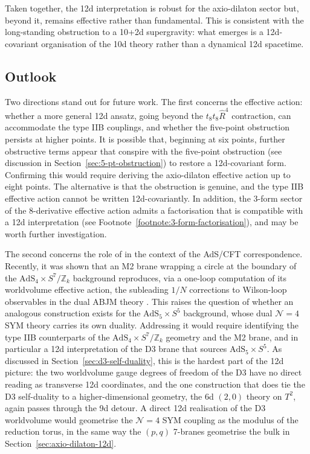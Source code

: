 Taken together, the 12d interpretation is robust for the axio-dilaton sector but, beyond it, remains effective rather than fundamental.
This is consistent with the long-standing obstruction to a 10+2d supergravity: what emerges is a 12d-covariant organisation of the 10d theory rather than a dynamical 12d spacetime.

\subsection{Outlook}

Two directions stand out for future work. 
The first concerns the effective action: whether a more general 12d ansatz, going beyond the $t_8 t_8 \widehat{R}^4$ contraction, can accommodate the type IIB couplings, and whether the five-point obstruction persists at higher points. 
It is possible that, beginning at six points, further obstructive terms appear that conspire with the five-point obstruction (see discussion in Section~\ref{sec:5-pt-obstruction}) to restore a 12d-covariant form.
Confirming this would require deriving the axio-dilaton effective action up to eight points.
The alternative is that the obstruction is genuine, and the type IIB effective action cannot be written 12d-covariantly.
In addition, the 3-form sector of the 8-derivative effective action admits a factorisation that is compatible with a 12d interpretation (see Footnote~\ref{footnote:3-form-factorisation}), and may be worth further investigation.

The second concerns the role of \SLZ{} in the context of the AdS/CFT correspondence.
Recently, it was shown that an M2 brane wrapping a circle at the boundary of the $\mathrm{AdS}_4 \times S^7/\mathbb{Z}_k$ background reproduces, via a one-loop computation of its worldvolume effective action, the subleading $1/N$ corrections to Wilson-loop observables in the dual ABJM theory \cite{Giombi:2023vzu, Tseytlin:2024euk}.
This raises the question of whether an analogous construction exists for the $\mathrm{AdS}_5 \times S^5$ background, whose dual $\mathcal{N}=4$ SYM theory carries its own \SLZ{} duality.
Addressing it would require identifying the type IIB counterparts of the $\mathrm{AdS}_4 \times S^7/\mathbb{Z}_k$ geometry and the M2 brane, and in particular a 12d interpretation of the D3 brane that sources $\mathrm{AdS}_5 \times S^5$.
As discussed in Section~\ref{sec:d3-self-duality}, this is the hardest part of the 12d picture: the two worldvolume gauge degrees of freedom of the D3 have no direct reading as transverse 12d coordinates, and the one construction that does tie the D3 self-duality to a higher-dimensional geometry, the 6d $(2,0)$ theory on $T^2$, again passes through the 9d detour.
A direct 12d realisation of the D3 worldvolume \SLZ{} would geometrise the $\mathcal{N}=4$ SYM coupling as the modulus of the reduction torus, in the same way the $(p,q)$ 7-branes geometrise the bulk \SLZ{} in Section~\ref{sec:axio-dilaton-12d}.


